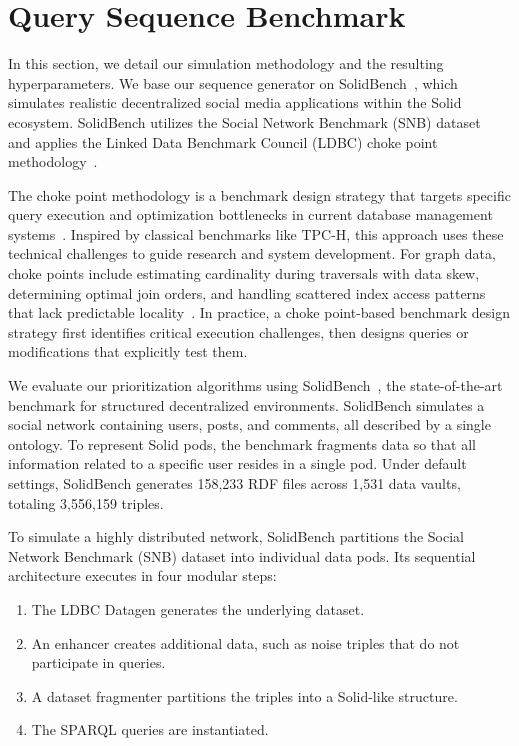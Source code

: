 \section{Query Sequence Benchmark}
\label{sec:simulation-methodology}
In this section, we detail our simulation methodology and the resulting hyperparameters.
We base our sequence generator on SolidBench~\cite{taelman2023link}, 
which simulates realistic decentralized social media applications within the Solid ecosystem.
SolidBench utilizes the Social Network Benchmark (SNB) dataset~\cite{erling2015ldbc,angles2020ldbc} 
and applies the Linked Data Benchmark Council (LDBC) choke point methodology~\cite{angles2014linked}.

The choke point methodology is a benchmark design strategy that targets specific query execution 
and optimization bottlenecks in current database management systems~\cite{boncz2013tpc}.
Inspired by classical benchmarks like TPC-H, this approach uses these technical challenges to guide research and system development. 
For graph data, choke points include estimating cardinality during traversals with data skew, determining optimal join orders, 
and handling scattered index access patterns that lack predictable locality~\cite{erling2015ldbc}. 
In practice, a choke point-based benchmark design strategy first identifies critical execution challenges, 
then designs queries or modifications that explicitly test them.

We evaluate our prioritization algorithms using SolidBench~\cite{taelman2023link},
the state-of-the-art benchmark for structured decentralized environments.
SolidBench simulates a social network containing users, posts, and comments,
all described by a single ontology.
To represent Solid pods, the benchmark fragments data so that all information
related to a specific user resides in a single pod.
Under default settings, SolidBench generates 158,233 RDF files across
1,531 data vaults, totaling 3,556,159 triples.

To simulate a highly distributed network, SolidBench partitions the Social
Network Benchmark (SNB) dataset into individual data pods.
Its sequential architecture executes in four modular steps:
\begin{enumerate}
    \item The LDBC Datagen generates the underlying dataset.
    \item An enhancer creates additional data, such as noise triples that
    do not participate in queries.
    \item A dataset fragmenter partitions the triples into a Solid-like structure.
    \item The SPARQL queries are instantiated.
\end{enumerate}


